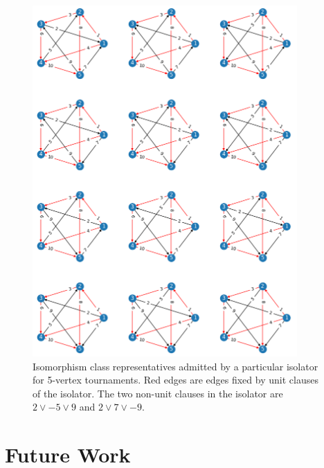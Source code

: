 \documentclass[a4paper,UKenglish,cleveref, autoref, thm-restate]{lipics-v2021}
\begin{document}
\begin{figure}
\includegraphics[width=0.9\textwidth]{iso_5.png}
\caption{Isomorphism class representatives admitted by a particular isolator for 5-vertex tournaments. Red edges are edges fixed by unit clauses of the isolator. The two non-unit clauses in the isolator are $2 \lor -5 \lor 9$ and $2 \lor 7 \lor -9$.} \label{fig2}
\end{figure}


\section{Future Work}

\end{document}
